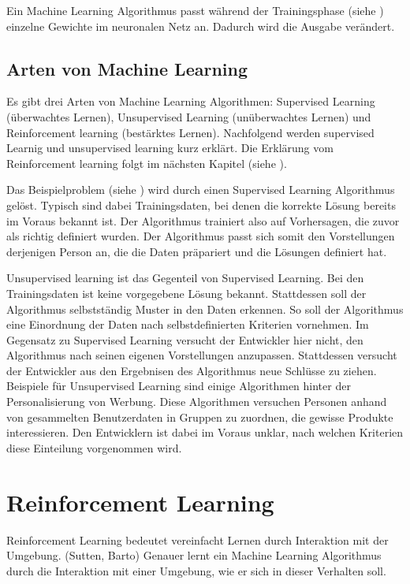 
Ein Machine Learning Algorithmus passt während der Trainingsphase (siehe
) einzelne Gewichte im neuronalen Netz an.
Dadurch wird die Ausgabe verändert.

\subsection*{Arten von Machine Learning}

Es gibt drei Arten von Machine Learning Algorithmen: Supervised Learning
(überwachtes Lernen), Unsupervised Learning (unüberwachtes Lernen) und
Reinforcement learning (bestärktes Lernen). Nachfolgend werden supervised
Learnig und unsupervised learning kurz erklärt. Die Erklärung vom Reinforcement
learning folgt im nächsten Kapitel (siehe ).

Das Beispielproblem (siehe ) wird durch einen Supervised Learning
Algorithmus gelöst. Typisch sind dabei Trainingsdaten, bei denen die korrekte
Lösung bereits im Voraus bekannt ist. Der Algorithmus trainiert also auf
Vorhersagen, die zuvor als richtig definiert wurden. Der Algorithmus passt sich
somit den Vorstellungen derjenigen Person an, die die Daten präpariert und die
Lösungen definiert hat.

Unsupervised learning ist das Gegenteil von Supervised Learning. Bei den
Trainingsdaten ist keine vorgegebene Lösung bekannt. Stattdessen soll der
Algorithmus selbstständig Muster in den Daten erkennen. So soll der Algorithmus
eine Einordnung der Daten nach selbstdefinierten Kriterien vornehmen. Im
Gegensatz zu Supervised Learning versucht der Entwickler hier nicht, den
Algorithmus nach seinen eigenen Vorstellungen anzupassen. Stattdessen versucht
der Entwickler aus den Ergebnisen des Algorithmus neue Schlüsse zu ziehen.
Beispiele für Unsupervised Learning sind einige Algorithmen hinter der
Personalisierung von Werbung. Diese Algorithmen versuchen Personen anhand von
gesammelten Benutzerdaten in Gruppen zu zuordnen, die gewisse Produkte
interessieren. Den Entwicklern ist dabei im Voraus unklar, nach welchen
Kriterien diese Einteilung vorgenommen wird. 

\section{Reinforcement Learning}
\label{chap:t_rl}
Reinforcement Learning bedeutet vereinfacht Lernen durch Interaktion mit der
Umgebung. (Sutten, Barto) Genauer lernt ein Machine Learning Algorithmus durch
die Interaktion mit einer Umgebung, wie er sich in dieser Verhalten soll.

